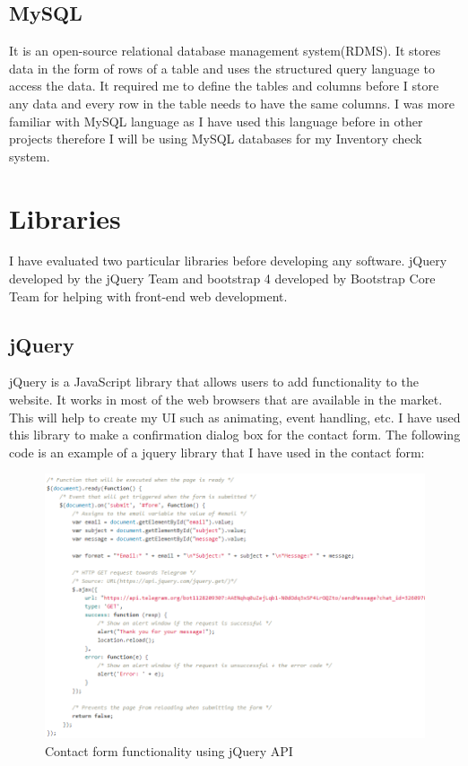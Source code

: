 \subsection{MySQL}
It is an open-source relational database management system(RDMS). It stores data in the form of rows of a table and uses the structured query language to access the data. It required me to define the tables and columns before I store any data and every row in the table needs to have the same columns. I was more familiar with MySQL language as I have used this language before in other projects therefore I will be using MySQL databases for my Inventory check system.

\section{Libraries}
I have evaluated two particular libraries before developing any software. jQuery developed by the jQuery Team and bootstrap 4 developed by Bootstrap Core Team for helping with front-end web development.

\newpage
\subsection{jQuery}
jQuery is a JavaScript library that allows users to add functionality to the website. It works in most of the web browsers that are available in the market. This will help to create my UI such as animating, event handling, etc. I have used this library to make a confirmation dialog box for the contact form. The following code is an example of a jquery library that I have used in the contact form:
\begin{figure}[h]
\centering
    \includegraphics[scale=0.7]
    {images/contact.png}
    \caption{Contact form functionality using jQuery API }
    \label{fig: Contact form functionality using jQuery API}
\end{figure}

